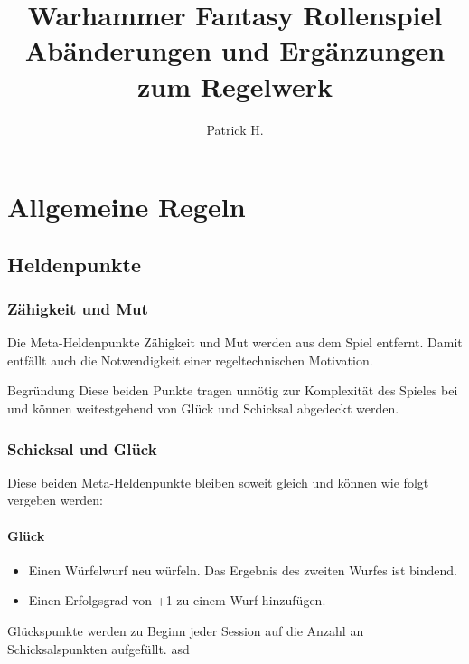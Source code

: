 \documentclass[a4paper,10pt,twoside,twocolumn,openany,nodeprecatedcode,bg=print]{dndbook}
\title{
  Warhammer Fantasy Rollenspiel\newline
  \large Abänderungen und Ergänzungen zum Regelwerk
  }
\author{Patrick H.}
\date{}
\begin{document}





\chapter{Allgemeine Regeln}
\section{Heldenpunkte}
\subsection{Zähigkeit und Mut}
Die Meta-Heldenpunkte Zähigkeit und Mut werden aus dem Spiel entfernt.
Damit entfällt auch die Notwendigkeit einer regeltechnischen Motivation.

\begin{DndComment}{Begründung}
  Diese beiden Punkte tragen unnötig zur Komplexität des Spieles bei und können weitestgehend von Glück und Schicksal abgedeckt werden.
\end{DndComment}

\subsection{Schicksal und Glück}
Diese beiden Meta-Heldenpunkte bleiben soweit gleich und können wie folgt vergeben werden:
\subsubsection{Glück}
\begin{itemize}
  \item Einen Würfelwurf neu würfeln. Das Ergebnis des zweiten Wurfes ist bindend.
  \item Einen Erfolgsgrad von +1 zu einem Wurf hinzufügen.
\end{itemize}
Glückspunkte werden zu Beginn jeder Session auf die Anzahl an Schicksalspunkten aufgefüllt.
asd
\end{document}
